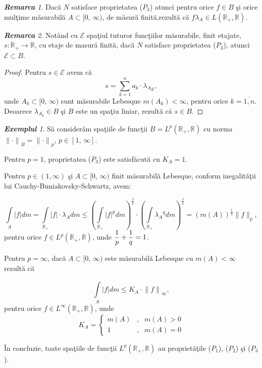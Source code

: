\documentclass[ a4paper, 12pt]{report}
\theoremstyle{definition}
\theoremstyle{remark}
\newtheorem{remarc}{\bf Remarca}[section]
\newtheorem{exemple}{\bf Exemplul}[section]
\numberwithin{equation}{section}
\begin{document}
\begin{remarc}
Dac\u a $N$ satisface proprietatea ($P_3$) atunci pentru orice $f \in B$ \c si orice mul\c time m\u asurabil\u a $A \subset [0, \, \infty)$, de m\u asur\u a finit\u a,rezult\u  a c\u a $f\lambda_A \in L(\mathbb{R}_+, \mathbb{R})$.
\end{remarc}

\begin{remarc}
Not\^ and cu $\mathcal{E}$ spa\c tiul tuturor func\c tiilor m\u asurabile, finit etajate, $s:\mathbb{R_+} \rightarrow \mathbb{R}$, cu etaje de masur\u a finit\u a, dac\u a $N$ satisface proprietatea ($P_3$), atunci $\mathcal{E} \subset B$.
\end{remarc}

\begin{proof}
Pentru $s \in \mathcal{E}$ avem c\u a
$$s=\sum\limits_{k=1}^{n}{a_k \cdot {\lambda_A}_k},$$ unde $A_k \subset [0, \, \infty)$ sunt m\u asurabile Lebesque $m(A_k)<\infty$, pentru orice $k=\overline{1, n}$.
Deoarece $\lambda_{A_k} \in B$ \c si $B$ este un spa\c tiu liniar, rezult\u a c\u a $s \in B$.
\end{proof}


\begin{exemple} S\u a consider\u am spa\c tiile de func\c tii  $B = L^p(\mathbb{R_+,\mathbb{R}})$ cu  norma ${\lVert \cdot \rVert}_B = {\lVert \cdot \rVert}_p$, $p \in [1, \, \infty]$.

Pentru $p=1$,
proprietatea ($P_3$) este satisf\u acut\u a cu $K_A = 1$.

Pentru $p \in (1,\infty)$ \c si $A \subset [0, \, \infty)$ finit m\u asurabil\u a Lebesque, conform inegalit\u a\c tii lui Cauchy-Buniakovsky-Schwartz, avem:

$$\int\limits_{A}^{}{\lvert f \rvert} dm = \int\limits_{\mathbb{R_+}}^{}{\lvert f \rvert \cdot \lambda_A} d m \leq {(\int\limits_{\mathbb{R_+}}^{}{{\lvert f \rvert}^p}dm)}^{\frac{1}{p}} \cdot {(\int\limits_{\mathbb{R_+}}^{}{{\lambda_A}^q}dm)}^{\frac{1}{q}}={(m(A))}^{\frac{1}{q}}\lVert f\rVert_p,$$
pentru orice $f \in L^p(\mathbb{R_+,\mathbb{R}})$, unde $\displaystyle\frac{1}{p} + \displaystyle\frac{1}{q} = 1$.

Pentru $p=\infty$, dac\u a $ A \subset [0, \, \infty)$ este m\u asurabil\u a Lebesque cu $m(A)<\infty$ rezult\u a c\u a

$$ \int\limits_{A}^{}{\lvert f \rvert} dm \leq K_A \cdot {\lVert f \rVert}_\infty,$$ pentru orice $f \in L^\infty(\mathbb{R}_+,\mathbb{R})$, unde
$$K_A = \left\{ \begin{array}{lcl} m(A)&,& m(A) > 0 \\
  1 &,& m(A)=0 \end{array} \right.$$

\^In concluzie, toate spa\c tiile de func\c tii $L^p(\mathbb{R_+,\mathbb{R}})$ au propriet\u a\c tile ($P_1$), ($P_2$) \c si ($P_3$).
\end{exemple}
\end{document}
